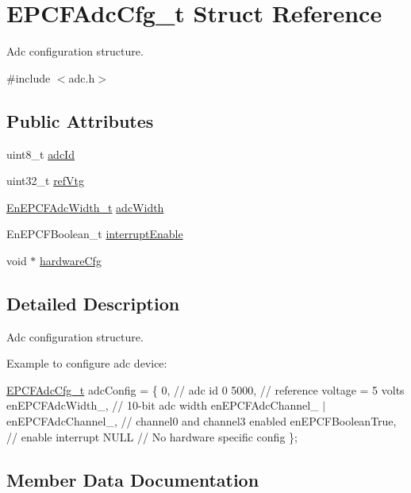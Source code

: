 \hypertarget{structEPCFAdcCfg__t}{}\section{E\+P\+C\+F\+Adc\+Cfg\+\_\+t Struct Reference}
\label{structEPCFAdcCfg__t}


Adc configuration structure.  




{\ttfamily \#include $<$adc.\+h$>$}

\subsection*{Public Attributes}
\begin{DoxyCompactItemize}
\item 
uint8\+\_\+t \mbox{\hyperlink{structEPCFAdcCfg__t_ab6d63cd9ea88de1b04aacaf21ff2141c}{adc\+Id}}
\item 
uint32\+\_\+t \mbox{\hyperlink{structEPCFAdcCfg__t_aa1e97380601c94cb2f1a7cc0bc3dbfe2}{ref\+Vtg}}
\item 
\mbox{\hyperlink{adc_8h_a95ed8e489525daf80ac43f789951d323}{En\+E\+P\+C\+F\+Adc\+Width\+\_\+t}} \mbox{\hyperlink{structEPCFAdcCfg__t_a6a46a2be012c39266a8084121babc9db}{adc\+Width}}
\item 
En\+E\+P\+C\+F\+Boolean\+\_\+t \mbox{\hyperlink{structEPCFAdcCfg__t_a2703092e7b7fb0b69c00cc9baa50c254}{interrupt\+Enable}}
\item 
void $\ast$ \mbox{\hyperlink{structEPCFAdcCfg__t_a67140923ad20ae39df63cf6cb0560f73}{hardware\+Cfg}}
\end{DoxyCompactItemize}


\subsection{Detailed Description}
Adc configuration structure. 

Example to configure adc device\+:

\mbox{\hyperlink{structEPCFAdcCfg__t}{E\+P\+C\+F\+Adc\+Cfg\+\_\+t}} adc\+Config = \{ 0, // adc id 0 5000, // reference voltage = 5 volts en\+E\+P\+C\+F\+Adc\+Width\+\_, // 10-\/bit adc width en\+E\+P\+C\+F\+Adc\+Channel\+\_ $\vert$ en\+E\+P\+C\+F\+Adc\+Channel\+\_, // channel0 and channel3 enabled en\+E\+P\+C\+F\+Boolean\+True, // enable interrupt N\+U\+LL // No hardware specific config \}; 

\subsection{Member Data Documentation}
\mbox{\label{structEPCFAdcCfg__t_ab6d63cd9ea88de1b04aacaf21ff2141c}} 
